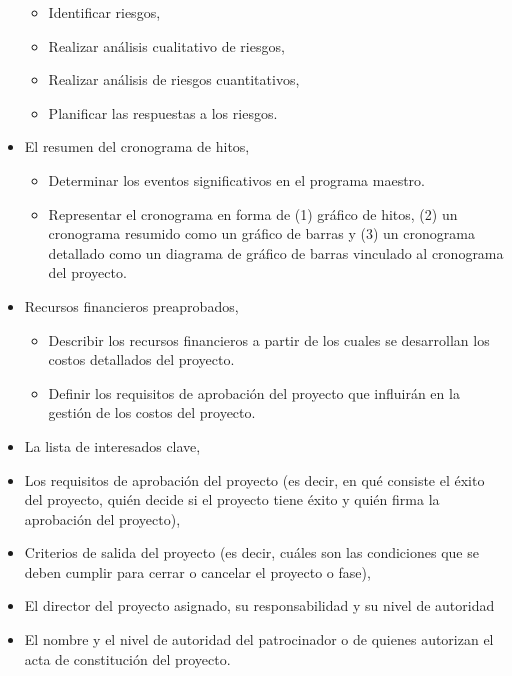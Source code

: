 \documentclass[letterpaper,12pt,openright,oneside]{article}
\theoremstyle{plain}
\begin{document}
\begin{itemize}
\begin{itemize}
            \item Identificar riesgos,
            \item Realizar análisis cualitativo de riesgos,
            \item Realizar análisis de riesgos cuantitativos,
            \item Planificar las respuestas a los riesgos.
        \end{itemize}
    \item El resumen del cronograma de hitos,
        \begin{itemize}
            \item Determinar los eventos significativos en el programa maestro.
            \item Representar el cronograma en forma de (1) gráfico de hitos, (2) un cronograma resumido como un gráfico de barras y (3) un cronograma detallado como un diagrama de gráfico de barras vinculado al cronograma del proyecto.
        \end{itemize}
    \item Recursos financieros preaprobados,
        \begin{itemize}
            \item Describir los recursos financieros a partir de los cuales se desarrollan los costos detallados del proyecto. 
            \item Definir los requisitos de aprobación del proyecto que influirán en la gestión de los costos del proyecto.
        \end{itemize}
    \item La lista de interesados clave,
    \item Los requisitos de aprobación del proyecto (es decir, en qué consiste el éxito del proyecto, quién decide si el proyecto tiene éxito y quién firma la aprobación del proyecto),
    \item Criterios de salida del proyecto (es decir, cuáles son las condiciones que se deben cumplir para cerrar o cancelar el proyecto o fase),
    \item El director del proyecto asignado, su responsabilidad y su nivel de autoridad
    \item El nombre y el nivel de autoridad del patrocinador o de quienes autorizan el acta de constitución del proyecto.
\end{itemize}
% 
% 
\end{document}
